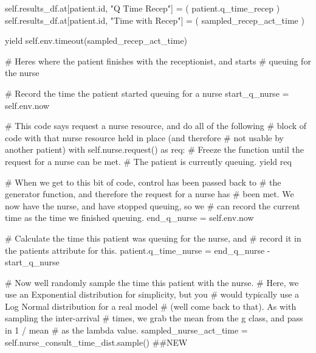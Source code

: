 \documentclass[
  letterpaper,
  DIV=11,
  numbers=noendperiod]{scrreprt}
\newenvironment{Shaded}{}{}
\newcommand{\BuiltInTok}[1]{\textcolor[rgb]{0.84,0.23,0.29}{#1}}
\newcommand{\CommentTok}[1]{\textcolor[rgb]{0.42,0.45,0.49}{#1}}
\newcommand{\ControlFlowTok}[1]{\textcolor[rgb]{0.84,0.23,0.29}{#1}}
\newcommand{\ImportTok}[1]{\textcolor[rgb]{0.01,0.18,0.38}{#1}}
\newcommand{\NormalTok}[1]{\textcolor[rgb]{0.14,0.16,0.18}{#1}}
\newcommand{\OperatorTok}[1]{\textcolor[rgb]{0.14,0.16,0.18}{#1}}
\newcommand{\StringTok}[1]{\textcolor[rgb]{0.01,0.18,0.38}{#1}}
\newcommand{\VariableTok}[1]{\textcolor[rgb]{0.89,0.38,0.04}{#1}}
\begin{document}
\begin{tcolorbox}
\begin{Shaded}
\begin{Highlighting}[]
            \VariableTok{self}\NormalTok{.results\_df.at[patient.}\BuiltInTok{id}\NormalTok{, }\StringTok{"Q Time Recep"}\NormalTok{] }\OperatorTok{=}\NormalTok{ (}
\NormalTok{                 patient.q\_time\_recep}
\NormalTok{            )}
            \VariableTok{self}\NormalTok{.results\_df.at[patient.}\BuiltInTok{id}\NormalTok{, }\StringTok{"Time with Recep"}\NormalTok{] }\OperatorTok{=}\NormalTok{ (}
\NormalTok{                 sampled\_recep\_act\_time}
\NormalTok{            )}

            \ControlFlowTok{yield} \VariableTok{self}\NormalTok{.env.timeout(sampled\_recep\_act\_time)}

        \CommentTok{\# Here\textquotesingle{}s where the patient finishes with the receptionist, and starts}
        \CommentTok{\# queuing for the nurse}

        \CommentTok{\# Record the time the patient started queuing for a nurse}
\NormalTok{        start\_q\_nurse }\OperatorTok{=} \VariableTok{self}\NormalTok{.env.now}

        \CommentTok{\# This code says request a nurse resource, and do all of the following}
        \CommentTok{\# block of code with that nurse resource held in place (and therefore}
        \CommentTok{\# not usable by another patient)}
        \ControlFlowTok{with} \VariableTok{self}\NormalTok{.nurse.request() }\ImportTok{as}\NormalTok{ req:}
            \CommentTok{\# Freeze the function until the request for a nurse can be met.}
            \CommentTok{\# The patient is currently queuing.}
            \ControlFlowTok{yield}\NormalTok{ req}

            \CommentTok{\# When we get to this bit of code, control has been passed back to}
            \CommentTok{\# the generator function, and therefore the request for a nurse has}
            \CommentTok{\# been met.  We now have the nurse, and have stopped queuing, so we}
            \CommentTok{\# can record the current time as the time we finished queuing.}
\NormalTok{            end\_q\_nurse }\OperatorTok{=} \VariableTok{self}\NormalTok{.env.now}

            \CommentTok{\# Calculate the time this patient was queuing for the nurse, and}
            \CommentTok{\# record it in the patient\textquotesingle{}s attribute for this.}
\NormalTok{            patient.q\_time\_nurse }\OperatorTok{=}\NormalTok{ end\_q\_nurse }\OperatorTok{{-}}\NormalTok{ start\_q\_nurse}

            \CommentTok{\# Now we\textquotesingle{}ll randomly sample the time this patient with the nurse.}
            \CommentTok{\# Here, we use an Exponential distribution for simplicity, but you}
            \CommentTok{\# would typically use a Log Normal distribution for a real model}
            \CommentTok{\# (we\textquotesingle{}ll come back to that).  As with sampling the inter{-}arrival}
            \CommentTok{\# times, we grab the mean from the g class, and pass in 1 / mean}
            \CommentTok{\# as the lambda value.}
\NormalTok{            sampled\_nurse\_act\_time }\OperatorTok{=} \VariableTok{self}\NormalTok{.nurse\_consult\_time\_dist.sample() }\CommentTok{\#\#NEW}


\end{Highlighting}
\end{Shaded}
\end{tcolorbox}
\end{document}
